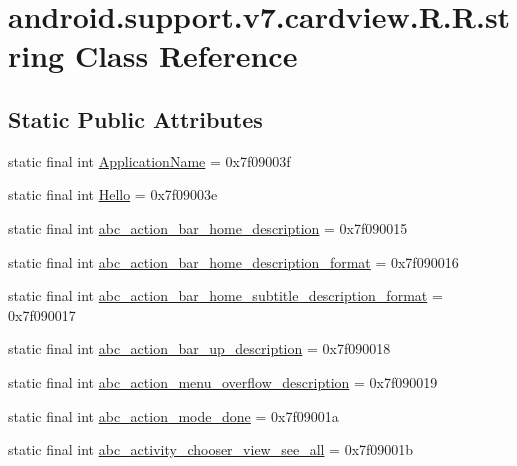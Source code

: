 \hypertarget{classandroid_1_1support_1_1v7_1_1cardview_1_1_r_1_1string}{
\section{android.support.v7.cardview.R.R.string Class Reference}
\label{classandroid_1_1support_1_1v7_1_1cardview_1_1_r_1_1string}
}
\subsection*{Static Public Attributes}
\begin{CompactItemize}
\item 
static final int \hyperlink{classandroid_1_1support_1_1v7_1_1cardview_1_1_r_1_1string_a0ab642198cd7240ab6442a1ed49bad1}{ApplicationName} = 0x7f09003f
\item 
static final int \hyperlink{classandroid_1_1support_1_1v7_1_1cardview_1_1_r_1_1string_4e61494828d82f93571e9ed8638ea32b}{Hello} = 0x7f09003e
\item 
static final int \hyperlink{classandroid_1_1support_1_1v7_1_1cardview_1_1_r_1_1string_0dd1d9d08b1d933f6d6a99c8751f3a14}{abc\_\-action\_\-bar\_\-home\_\-description} = 0x7f090015
\item 
static final int \hyperlink{classandroid_1_1support_1_1v7_1_1cardview_1_1_r_1_1string_7352185ffc6cbe4ed55283444f72bd32}{abc\_\-action\_\-bar\_\-home\_\-description\_\-format} = 0x7f090016
\item 
static final int \hyperlink{classandroid_1_1support_1_1v7_1_1cardview_1_1_r_1_1string_ac0a679d24699e363bb1f39dbe38a04b}{abc\_\-action\_\-bar\_\-home\_\-subtitle\_\-description\_\-format} = 0x7f090017
\item 
static final int \hyperlink{classandroid_1_1support_1_1v7_1_1cardview_1_1_r_1_1string_71413f2a5896feeeee9ffbd1cddb313b}{abc\_\-action\_\-bar\_\-up\_\-description} = 0x7f090018
\item 
static final int \hyperlink{classandroid_1_1support_1_1v7_1_1cardview_1_1_r_1_1string_fd782561866257675f88fac1325704ac}{abc\_\-action\_\-menu\_\-overflow\_\-description} = 0x7f090019
\item 
static final int \hyperlink{classandroid_1_1support_1_1v7_1_1cardview_1_1_r_1_1string_62b6cf64f3c2294f3319141000f94b04}{abc\_\-action\_\-mode\_\-done} = 0x7f09001a
\item 
static final int \hyperlink{classandroid_1_1support_1_1v7_1_1cardview_1_1_r_1_1string_2911fb3e208c04b27a1ddbd7bf8751fa}{abc\_\-activity\_\-chooser\_\-view\_\-see\_\-all} = 0x7f09001b

\end{CompactItemize}
